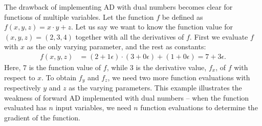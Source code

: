 The drawback of implementing AD with dual numbers becomes clear for functions of multiple variables. Let the function $f$ be defined as $f(x,y,z) = x\cdot y + z$. Let us say we want to know the function value for $(x,y,z) = (2,3,4)$ together with all the derivatives of $f$. First we evaluate $f$ with $x$ as the only varying parameter, and the rest as constants:
\begin{align*}
    f(x,y,z) &= (2+1\epsilon)\cdot(3+0\epsilon) + (1+0\epsilon)%
        =7+3\epsilon.
\end{align*}
Here, $7$ is the function value of $f$, while $3$ is the derivative value, $f_x$, of $f$ with respect to $x$. To obtain $f_y$ and $f_z$, we need two more function evaluations with respectively $y$ and $z$ as the varying parameters. This example illustrates the weakness of forward AD implemented with dual numbers -- when the function evaluated has $n$ input variables, we need $n$ function evaluations to determine the gradient of the function.

